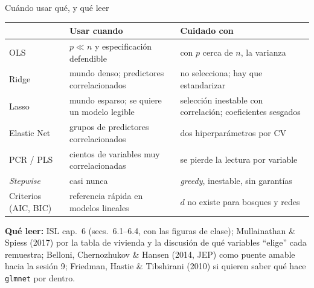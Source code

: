 \documentclass{beamer}
\newcommand{\1}{\mathbb{I}}
\begin{document}
\begin{frame}{Cuándo usar qué, y qué leer}
\small
\begin{center}
\scriptsize
\setlength{\tabcolsep}{4pt}
\renewcommand{\arraystretch}{1.2}
\begin{tabular}{lp{4.3cm}p{4.2cm}}
\hline
 & Usar cuando & Cuidado con \\
\hline
OLS & $p \ll n$ y especificación defendible & con $p$ cerca de $n$, la varianza \\
Ridge & mundo denso; predictores correlacionados & no selecciona; hay que estandarizar \\
Lasso & mundo esparso; se quiere un modelo legible & selección inestable con correlación; coeficientes sesgados \\
Elastic Net & grupos de predictores correlacionados & dos hiperparámetros por CV \\
PCR / PLS & cientos de variables muy correlacionadas & se pierde la lectura por variable \\
\emph{Stepwise} & casi nunca & \emph{greedy}, inestable, sin garantías \\
Criterios (AIC, BIC) & referencia rápida en modelos lineales & $d$ no existe para bosques y redes \\
\hline
\end{tabular}
\end{center}
\pause
\vspace{0.1cm}
\textbf{Qué leer:} ISL cap.\ 6 (secs.\ 6.1--6.4, con las figuras de clase); Mullainathan \& Spiess (2017) por la tabla de vivienda y la discusión de qué variables ``elige'' cada remuestra; Belloni, Chernozhukov \& Hansen (2014, JEP) como puente amable hacia la sesión 9; Friedman, Hastie \& Tibshirani (2010) si quieren saber qué hace \texttt{glmnet} por dentro.
\end{frame}
\end{document}
